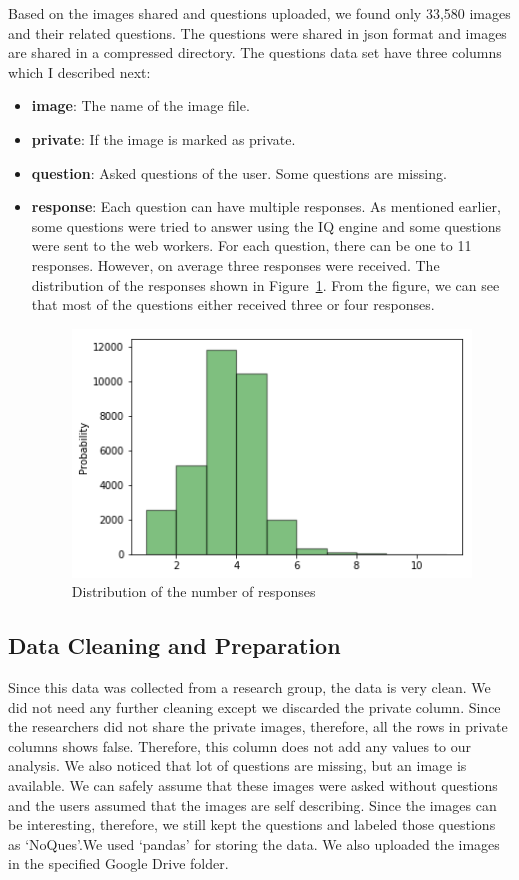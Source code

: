 \documentclass[sigconf]{acmart}
\begin{document}
Based on the images shared and questions uploaded, we found only 33,580 images and their related questions. The questions were shared in json format and images are shared in a compressed directory. The questions data set have three columns which I described next:
\begin{itemize}
    \item \textbf{image}: The name of the image file. 
    \item \textbf{private}: If the image is marked as private.
    \item \textbf{question}: Asked questions of the user. Some questions are missing. 
    \item \textbf{response}: Each question can have multiple responses. As mentioned earlier, some questions were tried to answer using the IQ engine and some questions were sent to the web workers. For each question, there can be one to 11 responses. However, on average three responses were received. The distribution of the responses shown in Figure~\ref{f:response count}. From  the figure, we can see that most of the questions either received three or four responses.
    \begin{figure}[!ht]
 \centering\includegraphics[width=\columnwidth]{images/r_count.png}
  \caption{Distribution of the number of responses}
  \label{f:response count}
\end{figure}

\end{itemize}

\subsection{Data Cleaning and Preparation}
Since this data was collected from a research group, the data is very clean. We did not need any further cleaning except we discarded the private column. Since the researchers did not share the private images, therefore, all the rows in private columns shows false. Therefore, this column does not add any values to our analysis. We also noticed that lot of questions are missing, but an image is available. We can safely assume that these images were asked without questions and the users assumed that the images are self describing. Since the images can be interesting, therefore, we still kept the questions and labeled those questions as `NoQues'.We used `pandas' for storing the data. We also uploaded the images in the specified Google Drive folder.
\end{document}
